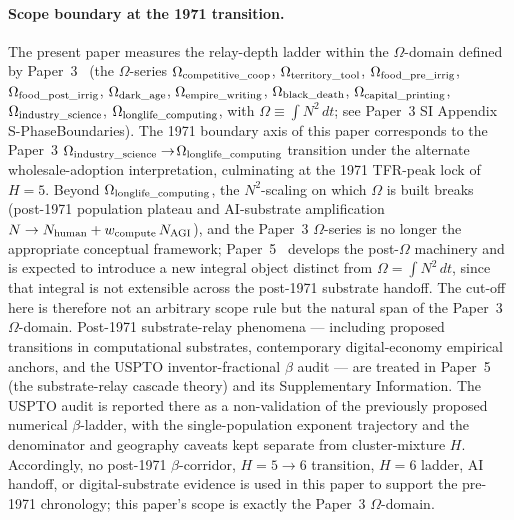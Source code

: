 \paragraph{Scope boundary at the 1971 transition.}
The present paper measures the relay-depth ladder within the \(\Omega\)-domain defined by Paper~3~\cite{Kato2026c} (the \(\Omega\)-series \(\Omega_{\rm competitive\_coop}\), \(\Omega_{\rm territory\_tool}\), \(\Omega_{\rm food\_pre\_irrig}\), \(\Omega_{\rm food\_post\_irrig}\), \(\Omega_{\rm dark\_age}\), \(\Omega_{\rm empire\_writing}\), \(\Omega_{\rm black\_death}\), \(\Omega_{\rm capital\_printing}\),\linebreak \(\Omega_{\rm industry\_science}\), \(\Omega_{\rm longlife\_computing}\), with \(\Omega\equiv \int N^{2}\,dt\); see Paper~3 SI Appendix S-Phase\linebreak Boundaries). The 1971 boundary axis of this paper corresponds to the Paper~3 \(\Omega_{\rm industry\_science}\to\)\linebreak \(\Omega_{\rm longlife\_computing}\) transition under the alternate wholesale-adoption interpretation, culminating at the 1971 TFR-peak lock of \(H=5\). Beyond \(\Omega_{\rm longlife\_computing}\), the \(N^{2}\)-scaling on which \(\Omega\) is built breaks (post-1971 population plateau and AI-substrate amplification \(N\to N_{\rm human}+w_{\rm compute}\,N_{\rm AGI}\)), and the Paper~3 \(\Omega\)-series is no longer the appropriate conceptual framework; Paper~5~\cite{Kato2026e} develops the post-\(\Omega\) machinery and is expected to introduce a new integral object distinct from \(\Omega=\int N^{2}\,dt\), since that integral is not extensible across the post-1971 substrate handoff. The cut-off here is therefore not an arbitrary scope rule but the natural span of the Paper~3 \(\Omega\)-domain. Post-1971 substrate-relay phenomena --- including proposed transitions in computational substrates, contemporary digital-economy empirical anchors, and the USPTO inventor-fractional \(\beta\) audit --- are treated in Paper~5~\cite{Kato2026e} (the substrate-relay cascade theory) and its Supplementary Information. The USPTO audit is reported there as a non-validation of the previously proposed numerical \(\beta\)-ladder, with the single-population exponent trajectory and the denominator and geography caveats kept separate from cluster-mixture \(H\). Accordingly, no post-1971 \(\beta\)-corridor, \(H=5\to6\) transition, \(H=6\) ladder, AI handoff, or digital-substrate evidence is used in this paper to support the pre-1971 chronology; this paper's scope is exactly the Paper~3 \(\Omega\)-domain.


